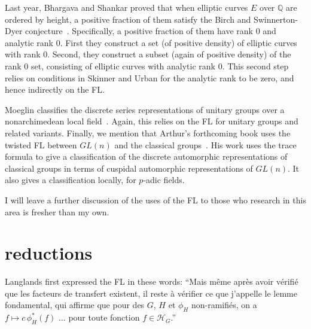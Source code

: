 \documentclass[brochure,english,12pt]{bourbaki}
\newcommand{\ring}[1]{\mathbb{#1}}
\begin{document}

Last year, Bhargava and Shankar proved that when elliptic curves $E$
over $\ring{Q}$ are ordered by height, a positive fraction of them
satisfy the Birch and Swinnerton-Dyer conjecture~\cite{BS:2010}.
Specifically, a positive fraction of them have rank $0$ and analytic
rank $0$.  First they construct a set (of positive density) of
elliptic curves with rank $0$.  Second, they construct a subset (again
of positive density) of the rank $0$ set, consisting of elliptic
curves with analytic rank $0$.  This second step relies on conditions
in Skinner and Urban for the analytic rank to be zero, and hence
indirectly on the FL.


Moeglin classifies the discrete series representations of unitary
groups over a nonarchimedean local field~\cite{Moeglin:2007}.  Again,
this relies on the FL for unitary groups and related
variants. Finally, we mention that Arthur's forthcoming book uses the
twisted FL between $GL(n)$ and the classical
groups~\cite{Arthur:2011}.  His work uses the trace formula to give a
classification of the discrete automorphic representations of
classical groups in terms of cuspidal automorphic representations of
$GL(n)$.  It also gives a classification locally, for $p$-adic fields.

I will leave a further discussion of the uses of the FL to those who research
in this area is fresher than my own.

%
%







\section{reductions}\label{sec:reduce}

Langlands first expressed the FL in these words:
``Mais m\^eme apr\`es avoir
v\'erifi\'e que les facteurs de
transfert existent, il reste \`a v\'erifier ce que j'appelle le
lemme fondamental, qui affirme que pour des $G$, $H$ et $\phi_H$
non-ramifi\'es, on a $f\mapsto c\, \phi_H^*(f)$ $\ldots$ pour toute fonction $f\in {\mathcal H}_G$.''
\cite[p.49]{Langlands:debuts}
\end{document}
